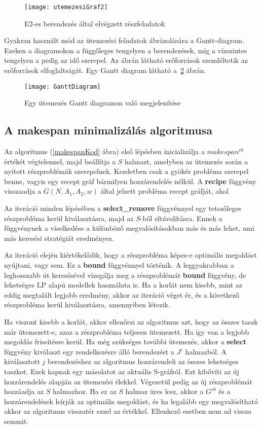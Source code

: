 \begin{figure}[H]
\begin{center}
\texttt{[image: utemezesiGraf2]}
\caption{E2-es berendezés által elvégzett részfeladatok}
\label{utemezesiGraf2}
\end{center}
\end{figure}
Gyakran használt mód az ütemezési feladatok ábrázolására a Gantt-diagram\cite{ganttwwf}\cite{ganttofw}. Ezeken a diagramokon a függőleges tengelyen a berendezések, míg a vízszintes tengelyen a pedig az idő szerepel. Az ábrán látható erőforrások szemléltetik az erőforrások elfoglaltságát. Egy Gantt diagram látható a~\ref{GanttDiagram} ábrán.
\begin{figure}[H]
\begin{center}
\texttt{[image: GanttDiagram]}
\caption{Egy ütemezés Gantt diagramon való megjelenítése}
\label{GanttDiagram}
\end{center}
\end{figure}

\subsection{A makespan minimalizálás algoritmusa}
Az algoritmus (\ref{makespanKod} ábra) első lépésben inicializálja a $makespan^{cb}$ értékét végtelennel, majd beállítja a $S$ halmazt, amelyben az ütemezés során a nyitott részproblémák szerepelnek. Kezdetben csak a gyökér probléma szerepel benne, vagyis egy recept gráf bármilyen hozzárendelés nélkül. A \textbf{recipe} függvény visszaadja a $G(N,A_1,A_2,w)$ által jelzett probléma recept gráfját, ahol


Az iteráció minden lépésében a \textbf{select\_remove} függvénnyel egy tetszőleges részprobléma kerül kiválasztásra, majd az $S$-ből eltávolításra. Ennek a függvénynek a viselkedése a különböző megvalósításokban más és más lehet, ami más keresési stratégiát eredményez.

Az iteráció elején kiértékelődik, hogy a részprobléma képes-e optimális megoldást nyújtani, vagy sem. Ez a \textbf{bound} függvénnyel történik. A leggyakrabban a leghosszabb út keresésével vizsgálja meg a részproblémát \textbf{bound} függvény, de lehetséges LP alapú modellek használata is. Ha a korlát nem kisebb, mint az eddig megtalált legjobb eredmény, akkor az iteráció véget ér, és a következő részprobléma kerül kiválasztásra, amennyiben létezik.

Ha viszont kisebb a korlát, akkor ellenőrzi az algoritmus azt, hogy az összes taszk már ütemezett-e, azaz a részprobléma teljesen ütemezett. Ha így van a legjobb megoldás frissítésre kerül. Ha még szükséges további ütemezés, akkor a  \textbf{select} függvény kiválaszt egy rendelkezésre álló berendezést a $J'$ halmazból. A kiválasztott $j$ berendezéshez az algoritmus hozzárendeli az összes lehetséges taszkot. Ezek kapnak egy másolatot az aktuális S-gráfról. Ezt kibővíti az új hozzárendelés alapján az ütemezési élekkel. Végezetül pedig az új részproblémát hozzáadja az $S$ halmazhoz. Ha ez az $S$ halmaz üres lesz, akkor a $G^{cb}$ és a hozzárendelések leírják az optimális megoldást, és ha legalább egy megvalósítható akkor az algoritmus visszatér ezzel az értékkel. Ellenkező esetben nem ad vissza semmit.

